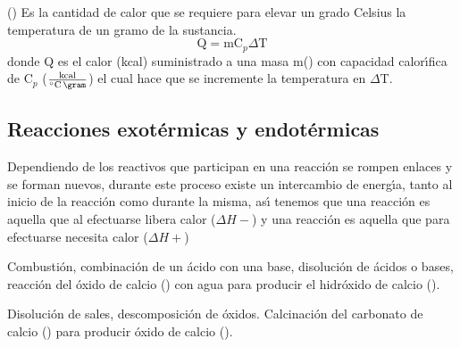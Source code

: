 \noindent\textbf{} () Es la cantidad de calor que se requiere para elevar un grado Celsius la temperatura de un gramo de la sustancia.
\begin{equation}
\textrm{Q} =\textrm{m} \textrm{C}_p \Delta \textrm{T}
\end{equation}
 donde
Q es el calor  (kcal) suministrado a una masa m(\gram) con capacidad calor\'{\i}fica de C$_p$ ($\frac{\textrm{kcal}}{^\circ \textrm{C}\,\gram}$) el cual hace que se incremente la temperatura en $\Delta$T.

\subsection{Reacciones exot\'ermicas y endot\'ermicas}

Dependiendo de los reactivos que participan en una reacci\'on se rompen enlaces y se forman nuevos, durante este proceso existe un intercambio de energ\'{\i}a, tanto al inicio de la reacci\'on como durante la misma, as\'{\i} tenemos que una reacci\'on  es aquella que al efectuarse libera calor ($\Delta H -$)
 y una reacci\'on  es aquella que para efectuarse necesita calor ($\Delta H +$) 

\begin{example} 
Combusti\'on, combinaci\'on de un \'acido con una base, disoluci\'on de \'acidos o bases, reacci\'on del \'oxido de calcio () con agua para producir el hidr\'oxido de calcio ().
\end{example}
\begin{example}
 Disoluci\'on de sales, descomposici\'on de \'oxidos. Calcinaci\'on del carbonato de calcio () para producir \'oxido de calcio ().
\end{example}

